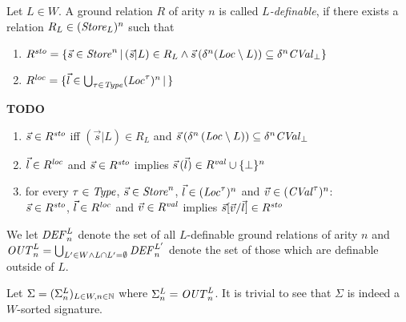 \documentclass[12pt,a4paper]{report}
\newcommand{\CVal}{\nstyle{CVal}}
\newcommand{\loc}{\nstyle{loc}}
\newcommand{\sto}{\nstyle{sto}}
\newcommand{\val}{\nstyle{val}}
\newcommand{\DEF}{\nstyle{DEF}}
\newcommand{\OUT}{\nstyle{OUT}}
\begin{document}
\begin{definition}[$L$-definability]
  Let $L \in W$. A ground relation $R$ of arity $n$ is called {\em $L$-definable}, if there
  exists a relation $R_L \in (\mathit{Store}_L)^n$ such that
  \begin{enumerate}
    \item $R^\sto = \{\vec{s}\in\Store^n\,|\, (\vec{s}|L)\in R_L 
                     \wedge \vec{s}\,(\delta^n(\Loc\setminus L)) \subseteq \delta^n \CVal_\bot\}$
    \item $R^\loc = \{\vec{l}\in\bigcup_{\tau\in\Type}(\Loc^\tau)^n\,|\,
                      \}$
  \end{enumerate}
  {\bf TODO}
  \begin{enumerate}
    \item $\vec{s}\in R^\sto$ iff $(\vec{s}|L) \in R_L$ and
          $\vec{s}\,(\delta^n\,(\Loc \setminus L)) \subseteq \delta^n \CVal_\bot$
    \item $\vec{l}\in R^\loc$ and $\vec{s}\in R^\sto$ implies
          $\vec{s}\,(\vec{l})\in R^\val \cup \{\bot\}^n$
    \item for every $\tau\in\mathit{Type}$, $\vec{s}\in\mathit{Store}^n$, $\vec{l}\in(\mathit{Loc}^\tau)^n$
          and $\vec{v}\in(\CVal^\tau)^n$: \\
          $\vec{s}\in R^\sto$, $\vec{l}\in R^\loc$ and $\vec{v}\in R^\val$ implies
          $\vec{s}[\vec{v}/\vec{l}]\in R^\sto$
  \end{enumerate}
\end{definition}

We let $\DEF^L_n$ denote the set of all $L$-definable ground relations
of arity $n$ and $\OUT^L_n = \bigcup_{L'\in W\wedge L \cap L' = \emptyset} \DEF^{L'}_n$ denote
the set of those which are definable outside of $L$.

Let $\Sigma = (\Sigma^L_n)_{L\in W,n\in \mathbb N}$ where $\Sigma^L_n = \OUT^L_n$. It is trivial to see
that $\Sigma$ is indeed a $W$-sorted signature.
\end{document}
